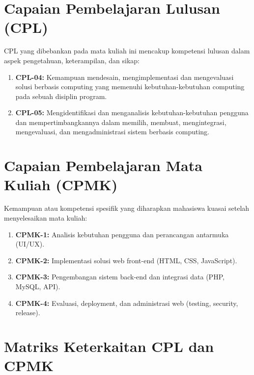 \vspace{1cm}

\section*{Capaian Pembelajaran Lulusan (CPL)}

CPL yang dibebankan pada mata kuliah ini mencakup kompetensi lulusan dalam aspek pengetahuan, keterampilan, dan sikap:

\begin{enumerate}
  \item \textbf{CPL-04:} Kemampuan mendesain, mengimplementasi dan mengevaluasi solusi berbasis computing yang memenuhi kebutuhan-kebutuhan computing pada sebuah disiplin program.
  \item \textbf{CPL-05:} Mengidentifikasi dan menganalisis kebutuhan-kebutuhan pengguna dan mempertimbangkannya dalam memilih, membuat, mengintegrasi, mengevaluasi, dan mengadministrasi sistem berbasis computing.
\end{enumerate}

\section*{Capaian Pembelajaran Mata Kuliah (CPMK)}

Kemampuan atau kompetensi spesifik yang diharapkan mahasiswa kuasai setelah menyelesaikan mata kuliah:

\begin{enumerate}
  \item \textbf{CPMK-1:} Analisis kebutuhan pengguna dan perancangan antarmuka (UI/UX).
  \item \textbf{CPMK-2:} Implementasi solusi web front-end (HTML, CSS, JavaScript).
  \item \textbf{CPMK-3:} Pengembangan sistem back-end dan integrasi data (PHP, MySQL, API).
  \item \textbf{CPMK-4:} Evaluasi, deployment, dan administrasi web (testing, security, release).
\end{enumerate}

\section*{Matriks Keterkaitan CPL dan CPMK}

